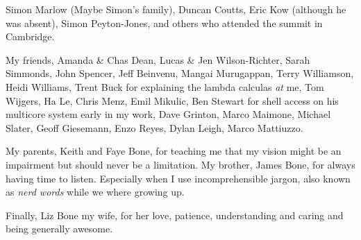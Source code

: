 \documentclass[a4paper,twoside]{report}
\begin{document}
Simon Marlow (Maybe Simon's family),
Duncan Coutts,
Eric Kow (although he was absent),
Simon Peyton-Jones,
and others who attended the \tscope summit in Cambridge.

My friends,
Amanda \& Chas Dean,
Lucas \& Jen Wilson-Richter,
Sarah Simmonds, John Spencer,
Jeff Beinvenu, Mangai Murugappan,
Terry Williamson, Heidi Williams,
Trent Buck for explaining the lambda calculas \emph{at} me,
Tom Wijgers,
Ha Le,
Chris Menz,
Emil Mikulic,
Ben Stewart for shell access on his multicore system early in my work,
Dave Grinton,
Marco Maimone,
Michael Slater,
Geoff Giesemann,
Enzo Reyes,
Dylan Leigh,
Marco Mattiuzzo.

My parents, Keith and Faye Bone,
for teaching me that my vision might be an impairment but should never
be a limitation.
My brother, James Bone, for always having time to listen.
Especially when I use incomprehensible jargon,
also known as \emph{nerd words} while we where growing up.

Finally, Liz Bone my wife,
for her love, patience, understanding and caring
and being generally awesome.


\tableofcontents

\listoffigures

\listoftables

\listofalgorithms











\end{document}
